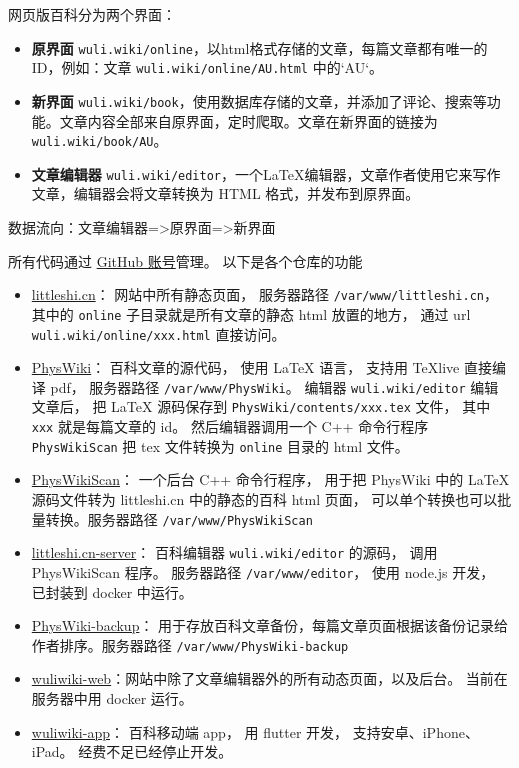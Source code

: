 
网页版百科分为两个界面：
\begin{itemize}
\item \textbf{原界面} \verb|wuli.wiki/online|，以html格式存储的文章，每篇文章都有唯一的ID，例如：文章 \verb|wuli.wiki/online/AU.html| 中的`AU`。 
\item \textbf{新界面} \verb|wuli.wiki/book|，使用数据库存储的文章，并添加了评论、搜索等功能。文章内容全部来自原界面，定时爬取。文章在新界面的链接为 \verb|wuli.wiki/book/AU|。
\item \textbf{文章编辑器} \verb|wuli.wiki/editor|，一个LaTeX编辑器，文章作者使用它来写作文章，编辑器会将文章转换为 HTML 格式，并发布到原界面。
\end{itemize}
数据流向：文章编辑器=>原界面=>新界面


所有代码通过 \href{https://github.com/wuliwiki}{GitHub 账号}管理。 以下是各个仓库的功能
\begin{itemize}
\item \href{https://github.com/MacroUniverse/littleshi.cn}{littleshi.cn}： 网站中所有静态页面， 服务器路径 \verb|/var/www/littleshi.cn|， 其中的 \verb`online` 子目录就是所有文章的静态 html 放置的地方， 通过 url \verb`wuli.wiki/online/xxx.html` 直接访问。
\item \href{https://github.com/MacroUniverse/PhysWiki}{PhysWiki}： 百科文章的源代码， 使用 LaTeX 语言， 支持用 TeXlive 直接编译 pdf， 服务器路径 \verb|/var/www/PhysWiki|。 编辑器 \verb`wuli.wiki/editor` 编辑文章后， 把 LaTeX 源码保存到 \verb`PhysWiki/contents/xxx.tex` 文件， 其中 \verb`xxx` 就是每篇文章的 id。 然后编辑器调用一个 C++ 命令行程序 \verb`PhysWikiScan` 把 tex 文件转换为 \verb`online` 目录的 html 文件。
\item \href{https://github.com/MacroUniverse/PhysWikiScan}{PhysWikiScan}： 一个后台 C++ 命令行程序， 用于把 PhysWiki 中的 LaTeX 源码文件转为 littleshi.cn 中的静态的百科 html 页面， 可以单个转换也可以批量转换。服务器路径 \verb|/var/www/PhysWikiScan|
\item \href{https://github.com/MacroUniverse/littleshi.cn-server}{littleshi.cn-server}： 百科编辑器 \verb`wuli.wiki/editor` 的源码， 调用 PhysWikiScan 程序。 服务器路径 \verb|/var/www/editor|， 使用 node.js 开发， 已封装到 docker 中运行。
\item \href{https://github.com/MacroUniverse/PhysWiki-backup}{PhysWiki-backup}： 用于存放百科文章备份，每篇文章页面根据该备份记录给作者排序。服务器路径 \verb|/var/www/PhysWiki-backup|
\item \href{https://github.com/MacroUniverse/wuliwiki-web}{wuliwiki-web}：网站中除了文章编辑器外的所有动态页面，以及后台。 当前在服务器中用 docker 运行。
\item \href{https://github.com/MacroUniverse/wuliwiki-app}{wuliwiki-app}： 百科移动端 app， 用 flutter 开发， 支持安卓、iPhone、iPad。 经费不足已经停止开发。
\end{itemize}

